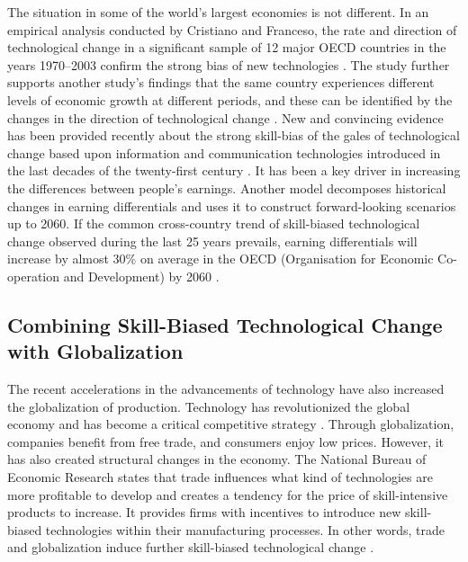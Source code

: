 \documentclass[12pt,oneside]{book} %
\begin{document}
The situation in some of the world's largest economies is not different. In an empirical analysis conducted by Cristiano and Franceso, the rate and direction of technological change in a significant sample of 12 major OECD countries in the years 1970–2003 confirm the strong bias of new technologies \cite{antonelli2010effects}. The study further supports another study's findings that the same country experiences different levels of economic growth at different periods, and these can be identified by the changes in the direction of technological change \cite{david2005tale}. New and convincing evidence has been provided recently about the strong skill-bias of the gales of technological change based upon information and communication technologies introduced in the last decades of the twenty-first century \cite{goldin2009race}. It has been a key driver in increasing the differences between people's earnings. Another model decomposes historical changes in earning differentials and uses it to construct forward-looking scenarios up to 2060. If the common cross-country trend of skill-biased technological change observed during the last 25 years prevails, earning differentials will increase by almost 30\% on average in the OECD (Organisation for Economic Co-operation and Development) by 2060 \cite{braconier_ruiz-valenzuela_2014}. 


\subsection{Combining Skill-Biased Technological Change with Globalization}

\hspace{20pt}The recent accelerations in the advancements of technology have also increased the globalization of production. Technology has revolutionized the global economy and has become a critical competitive strategy \cite{lamba2009role}. Through globalization, companies benefit from free trade, and consumers enjoy low prices. However, it has also created structural changes in the economy. The National Bureau of Economic Research states that trade influences what kind of technologies are more profitable to develop and creates a tendency for the price of skill-intensive products to increase. It provides firms with incentives to introduce new skill-biased technologies within their manufacturing processes. In other words, trade and globalization induce further skill-biased technological change \cite{acemoglu_2003}.
\end{document}
